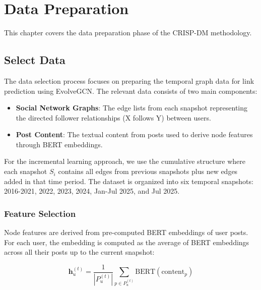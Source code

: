 
\chapter{Data Preparation}

This chapter covers the data preparation phase of the CRISP-DM methodology.

\section{Select Data}

The data selection process focuses on preparing the temporal graph data for link prediction using EvolveGCN. The relevant data consists of two main components:

\begin{itemize}
	\item \textbf{Social Network Graphs}: The edge lists from each snapshot representing the directed follower relationships (X follows Y) between users.
	\item \textbf{Post Content}: The textual content from posts used to derive node features through BERT embeddings.
\end{itemize}

For the incremental learning approach, we use the cumulative structure where each snapshot $S_i$ contains all edges from previous snapshots plus new edges added in that time period. The dataset is organized into six temporal snapshots: 2016-2021, 2022, 2023, 2024, Jan-Jul 2025, and Jul 2025.

\subsection*{Feature Selection}

Node features are derived from pre-computed BERT embeddings of user posts. For each user, the embedding is computed as the average of BERT embeddings across all their posts up to the current snapshot:

\begin{equation}
	\mathbf{h}_u^{(t)} = \frac{1}{|P_u^{(t)}|} \sum_{p \in P_u^{(t)}} \text{BERT}(\text{content}_p)
\end{equation}


